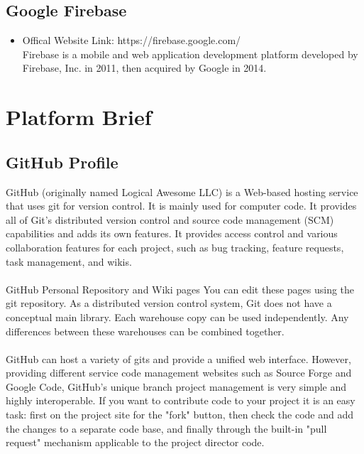 \subsection{Google Firebase}
\begin{itemize}
\item Offical Website Link: https://firebase.google.com/ \\ Firebase is a mobile and web application development platform developed by Firebase, Inc. in 2011, then acquired by Google in 2014.
\end{itemize}

\section{Platform Brief}
\subsection{GitHub Profile}
GitHub (originally named Logical Awesome LLC) is a Web-based hosting service that uses git for version control. It is mainly used for computer code. It provides all of Git's distributed version control and source code management (SCM) capabilities and adds its own features. It provides access control and various collaboration features for each project, such as bug tracking, feature requests, task management, and wikis. \\ \\ GitHub Personal Repository and Wiki pages You can edit these pages using the git repository. As a distributed version control system, Git does not have a conceptual main library. Each warehouse copy can be used independently. Any differences between these warehouses can be combined together. \\ \\ GitHub can host a variety of gits and provide a unified web interface. However, providing different service code management websites such as Source Forge and Google Code, GitHub's unique branch project management is very simple and highly interoperable. If you want to contribute code to your project it is an easy task: first on the project site for the "fork" button, then check the code and add the changes to a separate code base, and finally through the built-in "pull request" mechanism applicable to the project director code.
